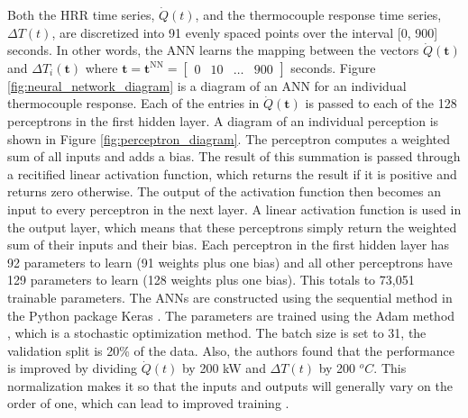 \documentclass{article}
\begin{document}
Both the HRR time series, $\dot{Q}(t)$, and the thermocouple response time series, $\Delta T (t)$, are discretized into 91 evenly spaced points over the interval [0, 900] seconds. In other words, the ANN learns the mapping between the vectors $\dot{Q}(\boldsymbol{t})$ and $\Delta T_i(\boldsymbol{t})$ where $\boldsymbol{t} = \boldsymbol{t}^{\text{NN}}  =  \begin{bmatrix} 0 & 10 & \ldots & 900 \end{bmatrix}$ seconds. Figure \ref{fig:neural_network_diagram} is a diagram of an ANN for an individual thermocouple response. Each of the entries in $\dot{Q}(\boldsymbol{t})$ is passed to each of the 128 perceptrons in the first hidden layer. A diagram of an individual perception is shown in Figure \ref{fig:perceptron_diagram}.  The perceptron computes a weighted sum of all inputs and adds a bias. The result of this summation is passed through a recitified linear activation function, which returns the result if it is positive and returns zero otherwise. The output of the activation function then becomes an input to every perceptron in the next layer. A linear activation function is used in the output layer, which means that these perceptrons simply return the weighted sum of their inputs and their bias. Each perceptron in the first hidden layer has 92 parameters to learn (91 weights plus one bias) and all other perceptrons have 129 parameters to learn (128 weights plus one bias). This totals to 73,051 trainable parameters. The ANNs are constructed using the sequential method in the Python package Keras \cite{chollet2018keras}. The parameters are trained using the Adam method \cite{kingma2014adam}, which is a stochastic optimization method. The batch size is set to 31, the validation split is  20\% of the data. Also, the authors found that the performance is improved by dividing $\dot{Q}(t)$ by 200 kW and $\Delta T(t)$ by 200 $^oC$. This normalization makes it so that the inputs and outputs will generally vary on the order of one, which can lead to improved training \cite{sola1997importance}. 
\end{document}
